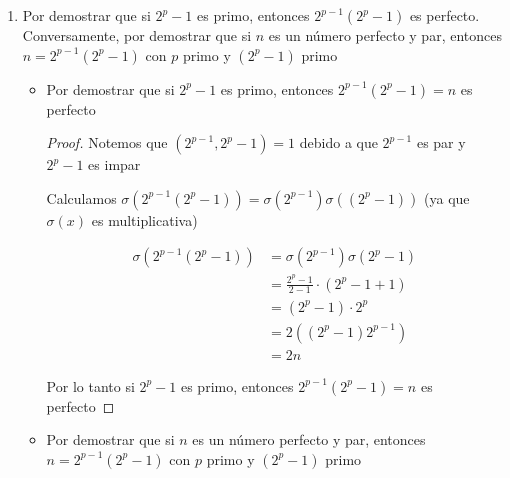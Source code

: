 \documentclass[12pt]{article}
\begin{document}
\begin{enumerate}
\begin{proof}
        La cual es una suma consecutiva de potencias de $2$
        
        Por lo tanto si $n$ es un número perfecto y par, entonces $n$ es una suma consecutiva de potencias de $2$
        
        \end{proof}
        
        
        \item Por demostrar que si $2^p - 1 $ es primo, entonces $2^{p-1}(2^p - 1)$ es perfecto. Conversamente, por demostrar que si $n$
        es un número perfecto y par, entonces $n = 2^{p-1}(2^p - 1)$ con $p$ primo y $(2^p - 1)$ primo
        
        
        \begin{itemize}
            \item Por demostrar que si $2^p - 1 $ es primo, entonces $2^{p-1}(2^p - 1) = n$ es perfecto
            
                \begin{proof}
                
               Notemos que $(2^{p-1}, 2^p -1) = 1$ debido a que $2^{p-1}$ es par y $ 2^p -1$ es impar
                
                
                Calculamos $\sigma (2^{p-1}(2^p - 1))  = \sigma (2^{p-1}) \sigma ((2^p - 1))$ (ya que $\sigma(x)$ es multiplicativa)
                
                \begin{align*}
                    \sigma (2^{p-1}(2^p - 1)) &= \sigma (2^{p-1}) \sigma (2^p - 1) \\
                                              &= \frac{2^p - 1}{2 - 1} \cdot (2^p - 1 + 1) \\
                                              &= (2^p - 1) \cdot 2^p \\
                                              &= 2((2^p - 1)2^{p-1}) \\
                                              &= 2n
                \end{align*}
                
                
                Por lo tanto si  $2^p - 1 $ es primo, entonces $2^{p-1}(2^p - 1) = n$ es perfecto
                
                \end{proof}
            
            
            
            \item Por demostrar que si $n$ es un número perfecto y par, entonces $n = 2^{p-1}(2^p - 1)$ con $p$ primo y $(2^p - 1)$ primo
            

\end{itemize}
\end{enumerate}
\end{document}
